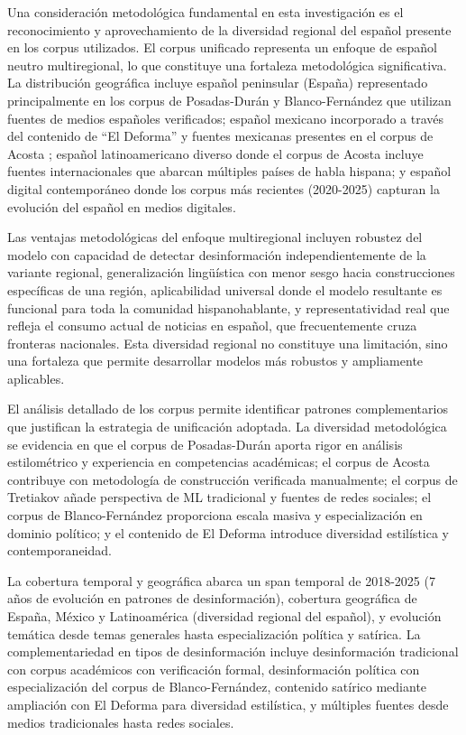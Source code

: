 Una consideración metodológica fundamental en esta investigación es el reconocimiento y aprovechamiento de la diversidad regional del español presente en los corpus utilizados. El corpus unificado representa un enfoque de español neutro multiregional, lo que constituye una fortaleza metodológica significativa. La distribución geográfica incluye español peninsular (España) representado principalmente en los corpus de Posadas-Durán \cite{posadas2019detection} y Blanco-Fernández \cite{blanco2024enhancing} que utilizan fuentes de medios españoles verificados; español mexicano incorporado a través del contenido de ``El Deforma'' y fuentes mexicanas presentes en el corpus de Acosta \cite{acosta2019construccion}; español latinoamericano diverso donde el corpus de Acosta incluye fuentes internacionales que abarcan múltiples países de habla hispana; y español digital contemporáneo donde los corpus más recientes (2020-2025) capturan la evolución del español en medios digitales.

Las ventajas metodológicas del enfoque multiregional incluyen robustez del modelo con capacidad de detectar desinformación independientemente de la variante regional, generalización lingüística con menor sesgo hacia construcciones específicas de una región, aplicabilidad universal donde el modelo resultante es funcional para toda la comunidad hispanohablante, y representatividad real que refleja el consumo actual de noticias en español, que frecuentemente cruza fronteras nacionales. Esta diversidad regional no constituye una limitación, sino una fortaleza que permite desarrollar modelos más robustos y ampliamente aplicables.

El análisis detallado de los corpus permite identificar patrones complementarios que justifican la estrategia de unificación adoptada. La diversidad metodológica se evidencia en que el corpus de Posadas-Durán aporta rigor en análisis estilométrico y experiencia en competencias académicas; el corpus de Acosta contribuye con metodología de construcción verificada manualmente; el corpus de Tretiakov añade perspectiva de ML tradicional y fuentes de redes sociales; el corpus de Blanco-Fernández proporciona escala masiva y especialización en dominio político; y el contenido de El Deforma introduce diversidad estilística y contemporaneidad.

La cobertura temporal y geográfica abarca un span temporal de 2018-2025 (7 años de evolución en patrones de desinformación), cobertura geográfica de España, México y Latinoamérica (diversidad regional del español), y evolución temática desde temas generales hasta especialización política y satírica. La complementariedad en tipos de desinformación incluye desinformación tradicional con corpus académicos con verificación formal, desinformación política con especialización del corpus de Blanco-Fernández, contenido satírico mediante ampliación con El Deforma para diversidad estilística, y múltiples fuentes desde medios tradicionales hasta redes sociales.

